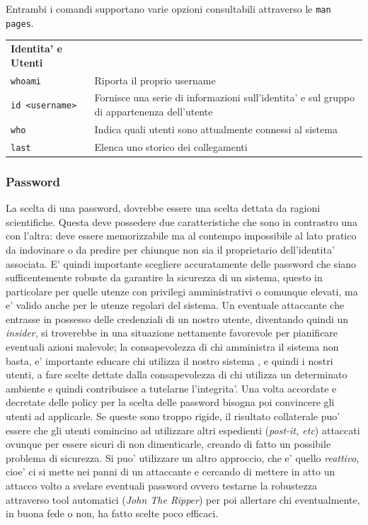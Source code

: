 Entrambi i comandi supportano varie opzioni consultabili attraverso le \texttt{man pages}.

\begin{center}
	\begin{tabular}{lp{10cm}}
	\textbf{Identita' e Utenti} & \\
	\texttt{whoami} & Riporta il proprio username \\
	\texttt{id <username>} & Fornisce una serie di informazioni sull'identita' e sul gruppo di appartenenza dell'utente\\
	\texttt{who} & Indica quali utenti sono attualmente connessi al sistema\\
	\texttt{last} & Elenca uno storico dei collegamenti \\
	\end{tabular}
\end{center}


\subsubsection{Password}
La scelta di una password, dovrebbe essere una scelta dettata da ragioni scientifiche. Questa deve possedere due caratteristiche che sono in contrastro una con l'altra: deve essere memorizzabile ma al contempo impossibile al lato pratico da indovinare o da predire per chiunque non sia il proprietario dell'identita' associata. E' quindi importante scegliere accuratamente delle password che siano sufficentemente robuste da garantire la sicurezza di un sistema, questo in particolare per quelle utenze con privilegi amministrativi o comunque elevati, ma e' valido anche per le utenze regolari del sistema. Un eventuale attaccante che entrasse in possesso delle credenziali di un nostro utente, diventando quindi un \emph{insider}, si troverebbe in una situazione nettamente favorevole per pianificare eventuali azioni malevole; la consapevolezza di chi amministra il sistema non basta, e' importante educare chi utilizza il nostro sistema , e quindi i nostri utenti, a fare scelte dettate dalla consapevolezza  di chi utilizza un determinato ambiente e quindi contribuisce a tutelarne l'integrita'. Una volta accordate e decretate delle policy per la scelta delle password bisogna poi convincere gli utenti ad applicarle. Se queste sono troppo rigide, il risultato collaterale puo' essere che gli utenti comincino ad utilizzare altri espedienti (\emph{post-it, etc}) attaccati ovunque per essere sicuri di non dimenticarle, creando di fatto un possibile problema di sicurezza. Si puo' utilizzare un altro approccio, che e' quello \emph{reattivo}, cioe' ci si mette nei panni di un attaccante e cercando di mettere in atto un attacco volto a svelare eventuali password ovvero testarne la robustezza attraverso tool automatici (\emph{John The Ripper}) per poi allertare chi eventualmente, in buona fede o non, ha fatto scelte poco efficaci.

